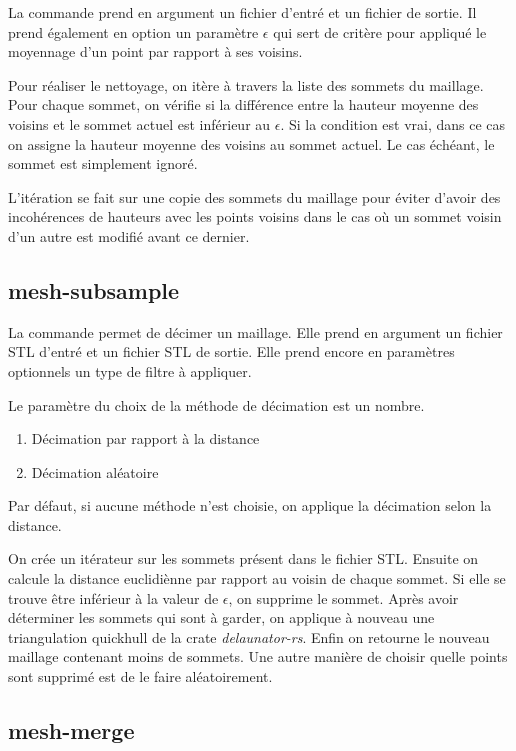 La commande prend en argument un fichier d'entré et un fichier de sortie. Il
prend également en option un paramètre $\epsilon$ qui sert de critère pour
appliqué le moyennage d'un point par rapport à ses voisins.

Pour réaliser le nettoyage, on itère à travers la liste des sommets du maillage.
Pour chaque sommet, on vérifie si la différence entre la hauteur moyenne des voisins
et le sommet actuel est inférieur au $\epsilon$.
Si la condition est vrai, dans ce cas on assigne la hauteur moyenne des voisins
au sommet actuel. Le cas échéant, le sommet est simplement ignoré.

L'itération se fait sur une copie des sommets du maillage pour éviter d'avoir
des incohérences de hauteurs avec les points voisins dans le cas où un sommet
voisin d'un autre est modifié avant ce dernier.

\subsection{mesh-subsample}

La commande permet de décimer un maillage. Elle
prend en argument un fichier STL d'entré et un fichier STL de sortie.
Elle prend encore en paramètres optionnels un type de filtre à appliquer.

Le paramètre du choix de la méthode de décimation est un nombre.

\begin{enumerate}
	\item Décimation par rapport à la distance
	\item Décimation aléatoire
\end{enumerate}

Par défaut, si aucune méthode n'est choisie, on applique la décimation selon la
distance.

On crée un itérateur sur les sommets présent dans le fichier STL. Ensuite on
calcule la distance euclidiènne par rapport au voisin de chaque sommet.
Si elle se trouve être inférieur à la valeur de $\epsilon$, on supprime le
sommet. Après avoir déterminer les sommets qui sont à garder, on applique à
nouveau une triangulation quickhull de la crate \textit{delaunator-rs}. Enfin on
retourne le nouveau maillage contenant moins de sommets. 
Une autre manière de
choisir quelle points sont supprimé est de le faire aléatoirement.

\subsection{mesh-merge}

